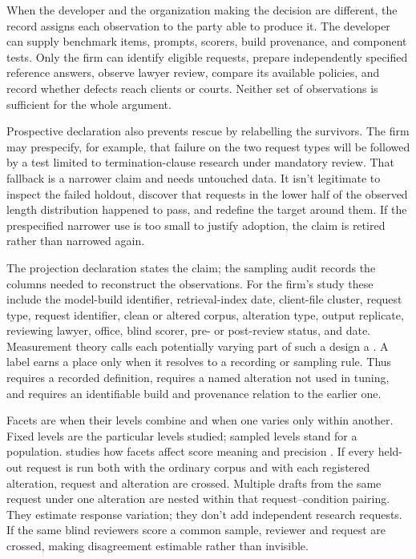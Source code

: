 \documentclass[12pt]{article}
\begin{document}
When the developer and the organization making the decision are different, the record assigns each observation to the party able to produce it. The developer can supply benchmark items, prompts, scorers, build provenance, and component tests. Only the firm can identify eligible requests, prepare independently specified reference answers, observe lawyer review, compare its available policies, and record whether defects reach clients or courts. Neither set of observations is sufficient for the whole argument.

Prospective declaration also prevents rescue by relabelling the survivors. The firm may prespecify, for example, that failure on the two request types will be followed by a test limited to termination-clause research under mandatory review. That fallback is a narrower claim and needs untouched data. It isn't legitimate to inspect the failed holdout, discover that requests in the lower half of the observed length distribution happened to pass, and redefine the target around them. If the prespecified narrower use is too small to justify adoption, the claim is retired rather than narrowed again.

The projection declaration states the claim; the sampling audit records the columns needed to reconstruct the observations. For the firm's study these include the model-build identifier, retrieval-index date, client-file cluster, request type, request identifier, clean or altered corpus, alteration type, output replicate, reviewing lawyer, office, blind scorer, pre- or post-review status, and date. Measurement theory calls each potentially varying part of such a design a . A label earns a place only when it resolves to a recording or sampling rule. Thus  requires a recorded definition,  requires a named alteration not used in tuning, and  requires an identifiable build and provenance relation to the earlier one.

Facets are  when their levels combine and  when one varies only within another. Fixed levels are the particular levels studied; sampled levels stand for a population. \mbox{} studies how facets affect score meaning and precision \citep{brennan2001generalizability}. If every held-out request is run both with the ordinary corpus and with each registered alteration, request and alteration are crossed. Multiple drafts from the same request under one alteration are nested within that request--condition pairing. They estimate response variation; they don't add independent research requests. If the same blind reviewers score a common sample, reviewer and request are crossed, making disagreement estimable rather than invisible.
\end{document}
